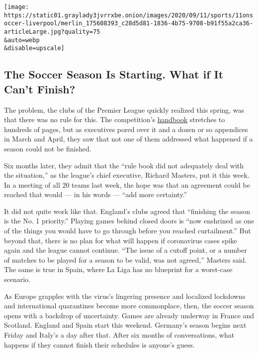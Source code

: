 \texttt{[image: https://static01.graylady3jvrrxbe.onion/images/2020/09/11/sports/11onsoccer-liverpool/merlin\_175608393\_c28d5d81-1836-4b75-9708-b91f55a2ca36-articleLarge.jpg?quality=75\\\&auto=webp\\\&disable=upscale]}

\hypertarget{the-soccer-season-is-starting-what-if-it-cant-finish}{%
\subsection{The Soccer Season Is Starting. What if It Can't
Finish?}\label{the-soccer-season-is-starting-what-if-it-cant-finish}}

The problem, the clubs of the Premier League quickly realized this
spring, was that there was no rule for this. The competition's
\href{https://resources.premierleague.com/premierleague/document/2020/09/11/dc7e76c1-f78d-45a2-be4a-4c6bc33368fa/2020-21-PL-Handbook-110920.pdf}{handbook}
stretches to hundreds of pages, but as executives pored over it and a
dozen or so appendices in March and April, they saw that not one of them
addressed what happened if a season could not be finished.

Six months later, they admit that the ``rule book did not adequately
deal with the situation,'' as the league's chief executive, Richard
Masters, put it this week. In a meeting of all 20 teams last week, the
hope was that an agreement could be reached that would --- in his words
--- ``add more certainty.''

It did not quite work like that. England's clubs agreed that ``finishing
the season is the No. 1 priority.'' Playing games behind closed doors is
``now enshrined as one of the things you would have to go through before
you reached curtailment.'' But beyond that, there is no plan for what
will happen if coronavirus cases spike again and the league cannot
continue. ``The issue of a cutoff point, or a number of matches to be
played for a season to be valid, was not agreed,'' Masters said. The
same is true in Spain, where La Liga has no blueprint for a worst-case
scenario.

As Europe grapples with the virus's lingering presence and localized
lockdowns and international quarantines become more commonplace, then,
the soccer season opens with a backdrop of uncertainty. Games are
already underway in France and Scotland. England and Spain start this
weekend. Germany's season begins next Friday and Italy's a day after
that. After six months of conversations, what happens if they cannot
finish their schedules is anyone's guess.

